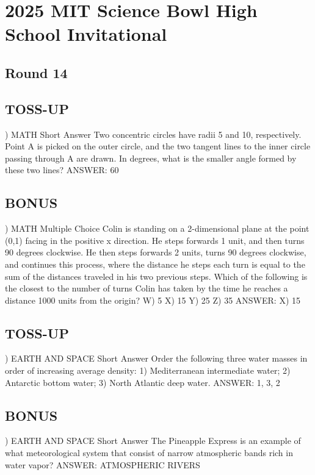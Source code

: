 \documentclass{article}
\begin{document}
\section*{2025 MIT Science Bowl High School Invitational}
\subsection*{Round 14}

\subsection*{TOSS-UP}
) MATH Short Answer Two concentric circles have radii 5 and 10, respectively. Point A is picked on the outer circle, and the two tangent lines to the inner circle passing through A are drawn. In degrees, what is the smaller angle formed by these two lines?
\noindent ANSWER: 60

\subsection*{BONUS}
) MATH Multiple Choice Colin is standing on a 2-dimensional plane at the point (0,1) facing in the positive x direction. He steps forwards 1 unit, and then turns 90 degrees clockwise. He then steps forwards 2 units, turns 90 degrees clockwise, and continues this process, where the distance he steps each turn is equal to the sum of the distances traveled in his two previous steps. Which of the following is the closest to the number of turns Colin has taken by the time he reaches a distance 1000 units from the origin?
\noindent W) 5
\noindent X) 15
\noindent Y) 25
\noindent Z) 35
\noindent ANSWER: X) 15

\subsection*{TOSS-UP}
) EARTH AND SPACE Short Answer Order the following three water masses in order of increasing average density: 1) Mediterranean intermediate water; 2) Antarctic bottom water; 3) North Atlantic deep water.
\noindent ANSWER: 1, 3, 2

\subsection*{BONUS}
) EARTH AND SPACE Short Answer The Pineapple Express is an example of what meteorological system that consist of narrow atmospheric bands rich in water vapor?
\noindent ANSWER: ATMOSPHERIC RIVERS
\end{document}

